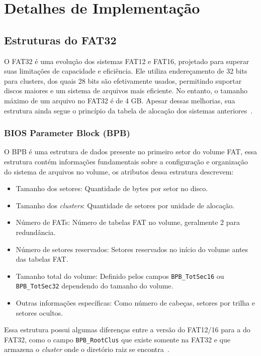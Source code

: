 \documentclass[
    12pt,				%
    oneside,   	        %
    a4paper,			%
    english,			%
    french,				%
    spanish,			%
    brazil,				%
    ]{pacotes/abntex2}
\begin{document}
\section{Detalhes de Implementação}
\label{sec:implementacao}

\subsection{Estruturas do FAT32}
\label{subsec:estrutura_fat}

O FAT32 é uma evolução dos sistemas FAT12 e FAT16, projetado para superar suas limitações de capacidade e eficiência. Ele utiliza endereçamento de 32 bits para clusters, dos quais 28 bits são efetivamente usados, permitindo suportar discos maiores e um sistema de arquivos mais eficiente. No entanto, o tamanho máximo de um arquivo no FAT32 é de 4 GB. Apesar dessas melhorias, sua estrutura ainda segue o princípio da tabela de alocação dos sistemas anteriores~\cite{osdev}.

\subsubsection{BIOS Parameter Block (BPB)}
\label{subsubsec:bpb}

O BPB é uma estrutura de dados presente no primeiro setor do volume FAT, essa estrutura contém informações fundamentais sobre a configuração e organização do sistema de arquivos no volume, os atributos dessa estrutura descrevem:

\begin{itemize}
    \item Tamanho dos setores: Quantidade de bytes por setor no disco.
    \item Tamanho dos \textit{clusters}: Quantidade de setores por unidade de alocação.
    \item Número de FATs: Número de tabelas FAT no volume, geralmente 2 para redundância.
    \item Número de setores reservados: Setores reservados no início do volume antes das tabelas FAT.
    \item Tamanho total do volume: Definido pelos campos \texttt{BPB\_TotSec16} ou \texttt{BPB\_TotSec32} dependendo do tamanho do volume.
    \item Outras informações específicas: Como número de cabeças, setores por trilha e setores ocultos.
\end{itemize}

Essa estrutura possui algumas diferenças entre a versão do FAT12/16 para a do FAT32, como o campo \texttt{BPB\_RootClus} que existe somente na FAT32 e que armazena o \textit{cluster} onde o diretório raiz se encontra~\cite{microsoft2000}.
\end{document}
